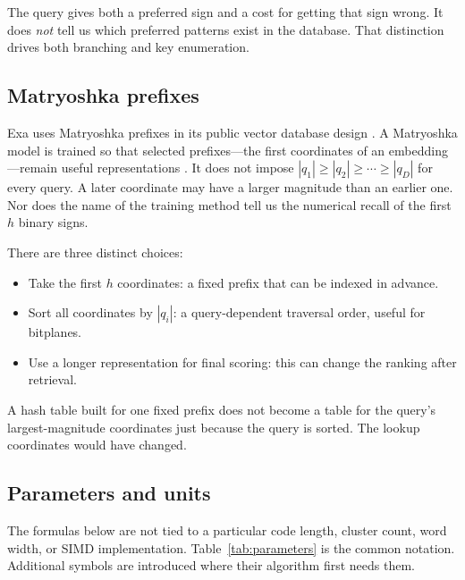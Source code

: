 The query gives both a preferred sign and a cost for getting that sign wrong. It does
\emph{not} tell us which preferred patterns exist in the database. That distinction drives
both branching and key enumeration.

\subsection{Matryoshka prefixes}
Exa uses Matryoshka prefixes in its public vector database design \cite{exa}.
A Matryoshka model is trained so that selected prefixes---the first coordinates of an
embedding---remain useful representations \cite{mrl}. It does not impose
$|q_1|\geq |q_2|\geq\cdots\geq |q_D|$ for every query. A later coordinate may have a larger
magnitude than an earlier one. Nor does the name of the training method tell us the numerical
recall of the first $h$ binary signs.

There are three distinct choices:
\begin{itemize}
\item Take the first $h$ coordinates: a fixed prefix that can be indexed in advance.
\item Sort all coordinates by $|q_i|$: a query-dependent traversal order, useful for bitplanes.
\item Use a longer representation for final scoring: this can change the ranking after retrieval.
\end{itemize}
A hash table built for one fixed prefix does not become a table for the query's largest-magnitude
coordinates just because the query is sorted. The lookup coordinates would have changed.

\subsection{Parameters and units}
The formulas below are not tied to a particular code length, cluster count, word width, or
SIMD implementation. Table~\ref{tab:parameters} is the common notation. Additional symbols are
introduced where their algorithm first needs them.

